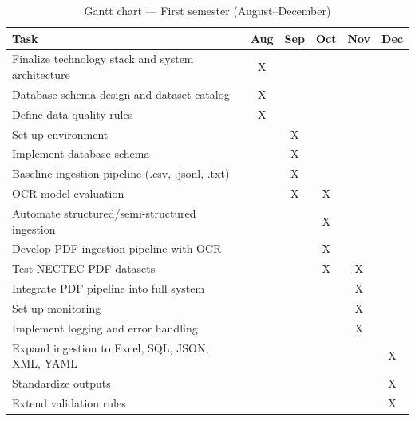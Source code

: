 \documentclass[12pt,oneside,openright,a4paper]{cpe-english-project}
\begin{document}
\begin{table}[H]
\centering
\caption{Gantt chart --- First semester (August--December)}\label{tbl:gantt-sem1}
\small
\begin{tabular}{|p{}|c|c|c|c|c|}
\hline
\textbf{Task} & \textbf{Aug} & \textbf{Sep} & \textbf{Oct} & \textbf{Nov} & \textbf{Dec} \\ \hline
Finalize technology stack and system architecture & X & & & & \\ \hline
Database schema design and dataset catalog & X & & & & \\ \hline
Define data quality rules & X & & & & \\ \hline
Set up environment & & X & & & \\ \hline
Implement database schema & & X & & & \\ \hline
Baseline ingestion pipeline (.csv, .jsonl, .txt) & & X & & & \\ \hline
OCR model evaluation & & X & X & & \\ \hline
Automate structured/semi-structured ingestion & & & X & & \\ \hline
Develop PDF ingestion pipeline with OCR & & & X & & \\ \hline
Test NECTEC PDF datasets & & & X & X & \\ \hline
Integrate PDF pipeline into full system & & & & X & \\ \hline
Set up monitoring & & & & X & \\ \hline
Implement logging and error handling & & & & X & \\ \hline
Expand ingestion to Excel, SQL, JSON, XML, YAML & & & & & X \\ \hline
Standardize outputs & & & & & X \\ \hline
Extend validation rules & & & & & X \\ \hline
\end{tabular}
\end{table}
\end{document}
